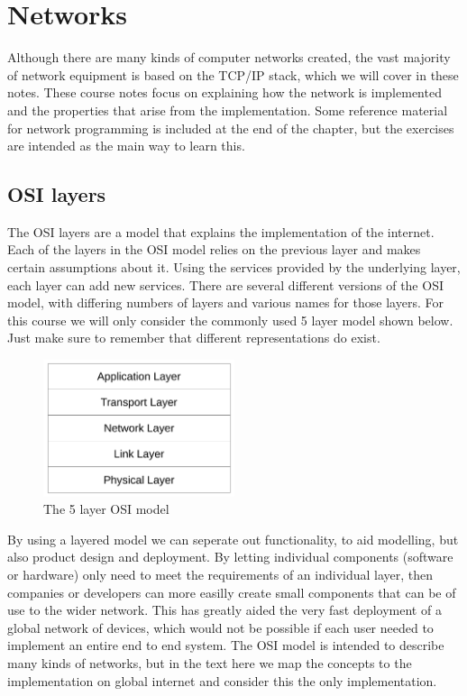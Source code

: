 \chapter{Networks}
\label{chap:network}

Although there are many kinds of computer networks created, the vast majority of network equipment is based on the TCP/IP stack, which we will cover in these notes. These course notes focus on explaining how the network is implemented and the properties that arise from the implementation. Some reference material for network programming is included at the end of the chapter, but the exercises are intended as the main way to learn this.

\section{OSI layers}
The OSI layers are a model that explains the implementation of the internet. Each of the layers in the OSI model relies on the previous layer and makes certain assumptions about it. Using the services provided by the underlying layer, each layer can add new services. There are several different versions of the OSI model, with differing numbers of layers and various names for those layers. For this course we will only consider the commonly used 5 layer model shown below. Just make sure to remember that different representations do exist.

\begin{figure}
  \includegraphics[width=0.5\textwidth]{img/osi.pdf}
  \centering
  \caption{The 5 layer OSI model}
  \label{fig:osi}
\end{figure}

By using a layered model we can seperate out functionality, to aid modelling, but also product design and deployment. By letting individual components (software or hardware) only need to meet the requirements of an individual layer, then companies or developers can more easilly create small components that can be of use to the wider network. This has greatly aided the very fast deployment of a global network of devices, which would not be possible if each user needed to implement an entire end to end system. The OSI model is intended to describe many kinds of networks, but in the text here we map the concepts to the implementation on global internet and consider this the only implementation. 

